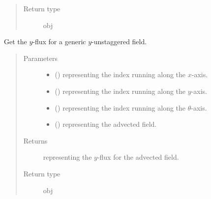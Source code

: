 \documentclass[letterpaper,10pt,english]{sphinxmanual}
\begin{document}
\begin{fulllineitems}
\begin{fulllineitems}
\begin{quote}
\begin{description}
\item[{Return type}] \leavevmode
obj

\end{description}\end{quote}

\end{fulllineitems}


\begin{fulllineitems}
\label{\detokenize{api:tasmania.dycore.flux_isentropic_nonconservative_centered.FluxIsentropicNonconservativeCentered._get_centered_flux_y_unstg}}
Get the \(y\)-flux for a generic \(y\)-unstaggered field.
\begin{quote}\begin{description}
\item[{Parameters}] \leavevmode\begin{itemize}
\item {} 
 () \textendash{}  representing the index running along the \(x\)-axis.

\item {} 
 () \textendash{}  representing the index running along the \(y\)-axis.

\item {} 
 () \textendash{}  representing the index running along the \(\theta\)-axis.

\item {} 
 () \textendash{}  representing the advected field.

\end{itemize}

\item[{Returns}] \leavevmode
{} representing the \(y\)-flux for the advected field.

\item[{Return type}] \leavevmode
obj


\end{description}
\end{quote}
\end{fulllineitems}
\end{fulllineitems}
\end{document}
